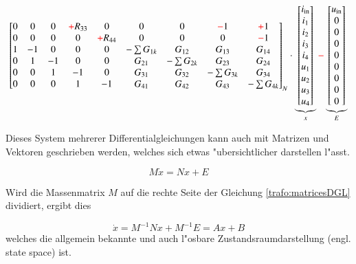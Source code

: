 \begin{refsection}
{\begin{align}
{\begin{bmatrix}
			0&0&0&\color{red}+\color{black}R_{33}&0 & 0&0&\color{red}-\color{black}1&\color{red}+\color{black}1 \\
			0&0&0&0&\color{red}+\color{black}R_{44} & 0&0&0&\color{red}-\color{black}1 \\
			1&-1&0&0&0 & -\sum G_{1k}&G_{12}&G_{13}&G_{14} \\
			0&1&-1&0&0 & G_{21} &- \sum G_{2k}& G_{23}& G_{24} \\
			0&0&1&-1&0 & G_{31} & G_{32} &-\sum G_{3k}&G_{34} \\
			0&0&0&1&-1 & G_{41}&G_{42}&G_{43}&-\sum G_{4k}
			\end{bmatrix}}_{\text{$N$}}
			\cdot
			\underbrace{\begin{bmatrix}
			i_\mathrm{in} \\
			i_1 \\
			i_2 \\
			i_3 \\
			i_4 \\
			u_1 \\
			u_2 \\
			u_3 \\
			u_4
			\end{bmatrix}}_{\text{$x$}}
			\color{red}-\color{black}
			\underbrace{\begin{bmatrix}
			u_\mathrm{in} \\
			0 \\
			0 \\
			0 \\
			0 \\
			0 \\
			0 \\
			0 \\
			0
			\end{bmatrix}}_{\text{$E$}}
			\label{trafo:symmetricalDGL}
\end{align}
}

Dieses System mehrerer Differentialgleichungen kann auch mit Matrizen und Vektoren geschrieben werden, welches sich etwas "ubersichtlicher darstellen l"asst. 

\begin{equation}
	M \dot x = N x + E
	\label{trafo:matricesDGL}
\end{equation}

Wird die Massenmatrix $M$ auf die rechte Seite der Gleichung \ref{trafo:matricesDGL} dividiert, ergibt dies

\begin{equation}
	\dot{x} = M^{-1}N x + M^{-1} E = A x + B
\end{equation}
welches die allgemein bekannte und auch l"osbare Zustandsraumdarstellung  (engl. state space) ist.


\end{refsection}
